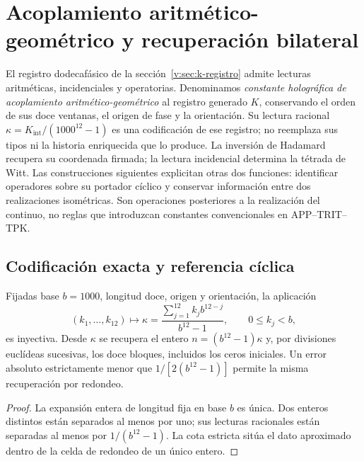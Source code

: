 \section{Acoplamiento aritmético-geométrico y recuperación bilateral}
\label{v:sec:acoplamiento-recuperacion}

El registro dodecafásico de la sección~\ref{v:sec:k-registro} admite
lecturas aritméticas, incidenciales y operatorias. Denominamos
\emph{constante holográfica de acoplamiento aritmético-geométrico}
al registro generado \(K\), conservando el orden de sus doce ventanas,
el origen de fase y la orientación. Su lectura racional
\(\kappa=K_{\mathrm{int}}/(1000^{12}-1)\) es una codificación de ese
registro; no reemplaza sus tipos ni la historia enriquecida que lo produce.
La inversión de Hadamard recupera su coordenada firmada; la lectura
incidencial determina la tétrada de Witt. Las construcciones siguientes
explicitan otras dos funciones: identificar operadores sobre su portador
cíclico y conservar información entre dos realizaciones isométricas.
Son operaciones posteriores a la realización del continuo, no reglas
que introduzcan constantes convencionales en APP--TRIT--TPK.

\subsection{Codificación exacta y referencia cíclica}
\label{v:subsec:acoplamiento-codigo}

\begin{proposition}
Fijadas base \(b=1000\), longitud doce, origen y orientación, la aplicación
\[
 (k_1,\ldots,k_{12})\longmapsto
 \kappa=\frac{\sum_{j=1}^{12}k_jb^{12-j}}{b^{12}-1},
 \qquad 0\leq k_j<b,
\]
es inyectiva. Desde \(\kappa\) se recupera el entero
\(n=(b^{12}-1)\kappa\) y, por divisiones euclídeas sucesivas, los doce
bloques, incluidos los ceros iniciales. Un error absoluto estrictamente
menor que \(1/[2(b^{12}-1)]\) permite la misma recuperación por redondeo.
\end{proposition}
\begin{proof}
La expansión entera de longitud fija en base \(b\) es única. Dos enteros
distintos están separados al menos por uno; sus lecturas racionales
están separadas al menos por \(1/(b^{12}-1)\). La cota estricta sitúa el
dato aproximado dentro de la celda de redondeo de un único entero.
\end{proof}

